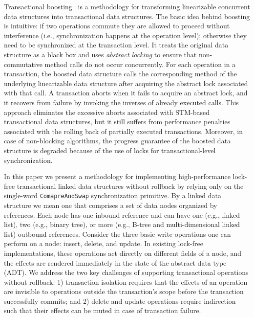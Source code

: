 \documentclass[10pt,conference,compsocconf]{IEEEtran}
\begin{document}
Transactional boosting~\cite{herlihy2008transactional} is a methodology for transforming linearizable concurrent data structures into transactional data structures.
The basic idea behind boosting is intuitive: if two operations commute they are allowed to proceed without interference (i.e., synchronization happens at the operation level); otherwise they need to be synchronized at the transaction level.
It treats the original data structure as a black box and uses \emph{abstract locking} to ensure that non-commutative method calls do not occur concurrently. 
For each operation in a transaction, the boosted data structure calls the corresponding method of the underlying linearizable data structure after acquiring the abstract lock associated with that call. 
A transaction aborts when it fails to acquire an abstract lock, and it recovers from failure by invoking the inverses of already executed calls. 
This approach eliminates the excessive aborts associated with STM-based transactional data structures, but it still suffers from performance penalties associated with the rolling back of partially executed transactions.
Moreover, in case of non-blocking algorithms, the progress guarantee of the boosted data structure is degraded because of the use of locks for transactional-level synchronization.
 
In this paper we present a methodology for implementing high-performance lock-free transactional linked data structures without rollback by relying only on the single-word \texttt{ComapreAndSwap} synchronization primitive.
By a linked data structure we mean one that comprises a set of data nodes organized by references. 
Each node has one inbound reference and can have one (e.g., linked list), two (e.g., binary tree), or more (e.g., B-tree and multi-dimensional linked list) outbound references.
Consider the three basic write operations one can perform on a node: insert, delete, and update.
In existing lock-free implementations, these operations act directly on different fields of a node, and the effects are rendered immediately in the state of the abstract data type (ADT).
We address the two key challenges of supporting transactional operations without rollback: 1) transaction isolation requires that the effects of an operation are invisible to operations outside the transaction's scope before the transaction successfully commits; and 2) delete and update operations require indirection such that their effects can be muted in case of transaction failure.
\end{document}
